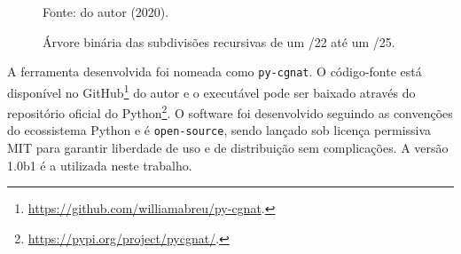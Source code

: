     \begin{figure}[!htb]
        \centering
        \caption{Árvore binária das subdivisões recursivas de um /22 até um /25.}
        \label{fig:arvore_binaria}
        
        \small

        {\small Fonte: do autor (2020).} 
    \end{figure}
    
    A ferramenta desenvolvida foi nomeada como {\tt py-cgnat}. O código-fonte está disponível no GitHub\footnote{\url{https://github.com/williamabreu/py-cgnat}.} do autor e o executável pode ser baixado através do repositório oficial do Python\footnote{\url{https://pypi.org/project/pycgnat/}.}. O software foi desenvolvido seguindo as convenções do ecossistema Python e é {\tt open-source}, sendo lançado sob licença permissiva MIT para garantir liberdade de uso e de distribuição sem complicações. A versão 1.0b1 é a utilizada neste trabalho.
    
